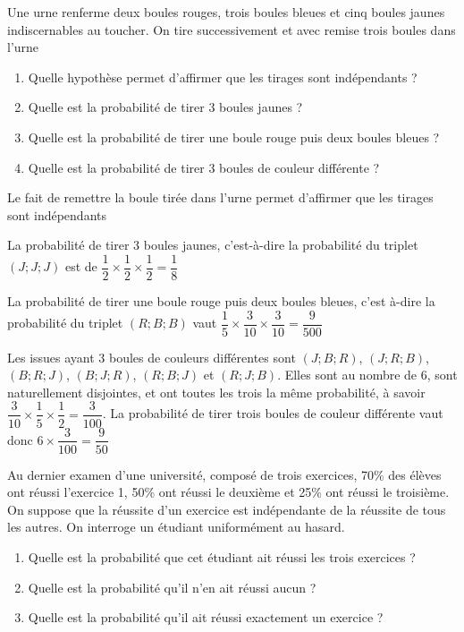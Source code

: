 \documentclass[11pt,fleqn, openany]{book} %
\begin{document}
\begin{exercise}Une urne renferme deux boules rouges, trois boules bleues et cinq boules jaunes indiscernables au toucher. On tire successivement et avec remise trois boules dans l'urne
\begin{enumerate}
\item Quelle hypothèse permet d'affirmer que les tirages sont indépendants ?
\item Quelle est la probabilité de tirer 3 boules jaunes ?
\item Quelle est la probabilité de tirer une boule rouge puis deux boules bleues ?
\item Quelle est la probabilité de tirer 3 boules de couleur différente ?
\end{enumerate}\end{exercise}

\begin{solution}Le fait de remettre la boule tirée dans l'urne permet d'affirmer que les tirages sont indépendants

La probabilité de tirer 3 boules jaunes, c'est-à-dire la probabilité du triplet $(J;J;J)$ est de $\dfrac{1}{2} \times \dfrac{1}{2} \times \dfrac{1}{2}=\dfrac{1}{8}$

La probabilité de tirer une boule rouge puis deux boules bleues, c'est à-dire la probabilité du triplet $(R;B;B)$ vaut $\dfrac{1}{5} \times \dfrac{3}{10} \times \dfrac{3}{10}=\dfrac{9}{500}$

Les issues ayant 3 boules de couleurs différentes sont $(J;B;R)$, $(J;R;B)$, $(B;R;J)$, $(B;J;R)$, $(R;B;J)$ et $(R;J;B)$. Elles sont au nombre de 6, sont naturellement disjointes, et ont toutes les trois la même probabilité, à savoir $\dfrac{3}{10} \times 	\dfrac{1}{5} \times \dfrac{1}{2} = \dfrac{3}{100}$. La probabilité de tirer trois boules de couleur différente vaut donc $6 \times \dfrac{3}{100} = \dfrac{9}{50}$\end{solution}




\begin{exercise}Au dernier examen d'une université, composé de trois exercices, 70\% des élèves ont réussi l'exercice 1, 50\% ont réussi le deuxième et 25\% ont réussi le troisième. On suppose que la réussite d'un exercice est indépendante de la réussite de tous les autres. On interroge un étudiant uniformément au hasard.
\begin{enumerate}
\item Quelle est la probabilité que cet étudiant ait réussi les trois exercices ?
\item Quelle est la probabilité qu'il n'en ait réussi aucun ?
\item Quelle est la probabilité qu'il ait réussi exactement un exercice ?
\end{enumerate}\end{exercise}
\end{document}
